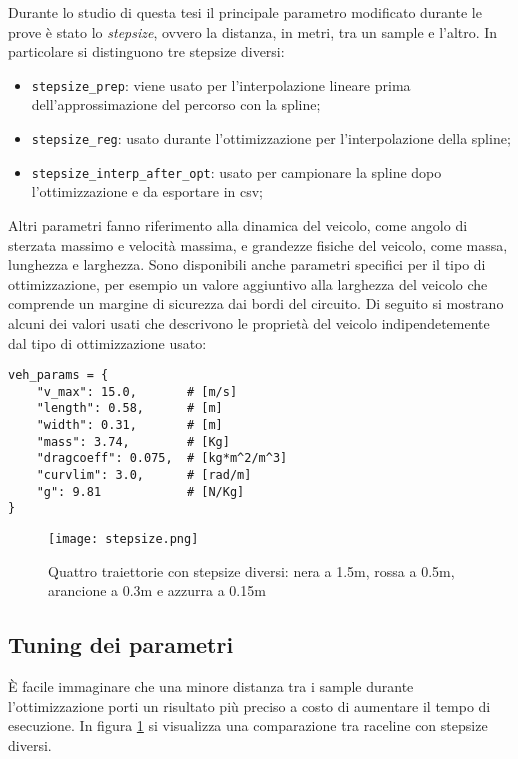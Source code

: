 Durante lo studio di questa tesi il principale parametro modificato durante le prove è stato lo
\textit{stepsize}, ovvero la distanza, in metri, tra un sample e l'altro. In particolare si distinguono
tre stepsize diversi:
\begin{itemize}
	\item \verb|stepsize_prep|: viene usato per l'interpolazione lineare prima dell'approssimazione del
		percorso con la spline;
	\item \verb|stepsize_reg|: usato durante l'ottimizzazione per l'interpolazione della spline;
	\item \verb|stepsize_interp_after_opt|: usato per campionare la spline dopo l'ottimizzazione e da
		esportare in csv;
\end{itemize}
Altri parametri fanno riferimento alla dinamica del veicolo, come angolo di sterzata massimo e velocità
massima, e grandezze fisiche del veicolo, come massa, lunghezza e larghezza. Sono disponibili anche
parametri specifici per il tipo di ottimizzazione, per esempio un valore aggiuntivo alla larghezza del
veicolo che comprende un margine di sicurezza dai bordi del circuito. Di seguito si mostrano alcuni dei
valori usati che descrivono le proprietà del veicolo indipendetemente dal tipo di ottimizzazione usato:

\begin{lstlisting}
veh_params = {
	"v_max": 15.0,       # [m/s]
	"length": 0.58,      # [m]
	"width": 0.31,       # [m]
	"mass": 3.74,        # [Kg]
	"dragcoeff": 0.075,  # [kg*m^2/m^3]
	"curvlim": 3.0,      # [rad/m]
	"g": 9.81            # [N/Kg]
}
\end{lstlisting}

\begin{figure}
	\begin{center}
		\texttt{[image: stepsize.png]}
	\end{center}
	\caption{Quattro traiettorie con stepsize diversi: nera a 1.5m, rossa a 0.5m,
	arancione a 0.3m e azzurra a 0.15m}
	\label{fig:stepsize}
\end{figure}

\subsection{Tuning dei parametri}
È facile immaginare che una minore distanza tra i sample durante l'ottimizzazione porti un risultato
più preciso a costo di aumentare il tempo di esecuzione. %
In figura \ref{fig:stepsize} si visualizza una comparazione tra raceline con stepsize diversi.

